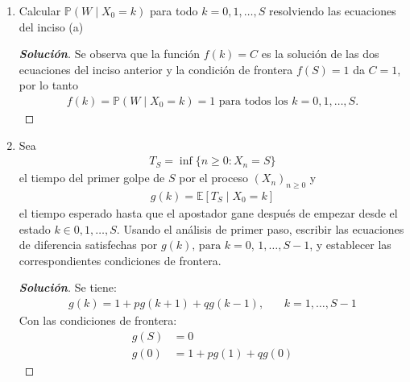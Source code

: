 \documentclass[12pt, letterpaper]{article}
\newcommand{\p}{\mathbb{P}}
\newenvironment{manualtheorem}[1]{%
  \renewcommand\themanualtheoreminner{#1}%
  \manualtheoreminner
}{\endmanualtheoreminner}
\newenvironment{solucion}
  {\renewcommand\qedsymbol{$\square$}\begin{proof}[\textbf{Solución}]}
  {\end{proof}}
\begin{document}
\begin{manualtheorem}{3.2}
\begin{enumerate}
        \item Calcular $\p(W \mid X_0 = k)$ para todo $k = 0, 1,\dots,S$ resolviendo las ecuaciones del inciso (a)
        \begin{solucion}
            Se observa que la función $f(k) = C$ es la solución de las dos ecuaciones del inciso anterior y la condición de frontera $f(S)=1$ da $C=1$, por lo tanto
            \begin{align*}
                f(k) = \p(W \mid X_0 = k)=1\textrm{ para todos los } k = 0, 1,\dots,S.
            \end{align*}
        \end{solucion}
        
        \item Sea
        \begin{align*}
            T_S=\inf\{n\geq 0: X_n=S\}
        \end{align*}
        el tiempo del primer golpe de $S$ por el proceso $(X_n)_{n\geq0}$ y
        \begin{align*}
            g(k)=\mathbb{E}[T_S\mid X_0 = k]
        \end{align*}
        el tiempo esperado hasta que el apostador gane después de empezar desde el estado $k\in{0, 1, \dots, S}$. Usando el análisis de primer paso, escribir las ecuaciones de diferencia satisfechas por $g(k)\textrm{, para }k=0$, $1, \dots, S-1$, y establecer las correspondientes condiciones de frontera.
        \begin{solucion}
            Se tiene:
            \begin{align*}
                g(k)=1+pg(k+1)+qg(k-1)\textrm{, }& & k=1,\dots,S-1
            \end{align*}
            Con las condiciones de frontera:
            \begin{align*}
                g(S)&=0\\
                g(0)&=1+pg(1)+qg(0)
            \end{align*}
        \end{solucion}
        

\end{enumerate}
\end{manualtheorem}
\end{document}
